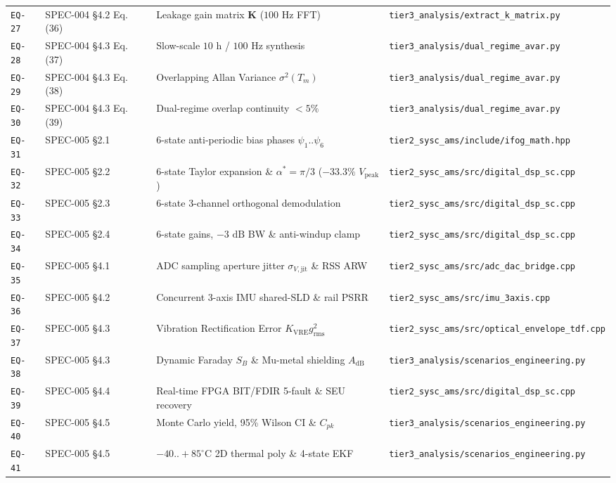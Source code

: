 \documentclass[11pt,a4paper]{article}
\begin{document}
\begin{longtable}{@{}l l l l@{}}
\texttt{EQ-27} & SPEC-004 \S 4.2 Eq. (36) & Leakage gain matrix $\mathbf{K}$ ($100\text{ Hz}$ FFT) & \texttt{tier3\_analysis/extract\_k\_matrix.py} \\
\texttt{EQ-28} & SPEC-004 \S 4.3 Eq. (37) & Slow-scale $10\text{ h}$ / $100\text{ Hz}$ synthesis & \texttt{tier3\_analysis/dual\_regime\_avar.py} \\
\texttt{EQ-29} & SPEC-004 \S 4.3 Eq. (38) & Overlapping Allan Variance $\sigma^2(T_m)$ & \texttt{tier3\_analysis/dual\_regime\_avar.py} \\
\texttt{EQ-30} & SPEC-004 \S 4.3 Eq. (39) & Dual-regime overlap continuity $< 5\%$ & \texttt{tier3\_analysis/dual\_regime\_avar.py} \\
\texttt{EQ-31} & SPEC-005 \S 2.1 & 6-state anti-periodic bias phases $\psi_1..\psi_6$ & \texttt{tier2\_sysc\_ams/include/ifog\_math.hpp} \\
\texttt{EQ-32} & SPEC-005 \S 2.2 & 6-state Taylor expansion \& $\alpha^*=\pi/3$ ($-33.3\%$ $V_{\text{peak}}$) & \texttt{tier2\_sysc\_ams/src/digital\_dsp\_sc.cpp} \\
\texttt{EQ-33} & SPEC-005 \S 2.3 & 6-state 3-channel orthogonal demodulation & \texttt{tier2\_sysc\_ams/src/digital\_dsp\_sc.cpp} \\
\texttt{EQ-34} & SPEC-005 \S 2.4 & 6-state gains, $-3\text{ dB}$ BW \& anti-windup clamp & \texttt{tier2\_sysc\_ams/src/digital\_dsp\_sc.cpp} \\
\texttt{EQ-35} & SPEC-005 \S 4.1 & ADC sampling aperture jitter $\sigma_{V,\text{jit}}$ \& RSS ARW & \texttt{tier2\_sysc\_ams/src/adc\_dac\_bridge.cpp} \\
\texttt{EQ-36} & SPEC-005 \S 4.2 & Concurrent 3-axis IMU shared-SLD \& rail PSRR & \texttt{tier2\_sysc\_ams/src/imu\_3axis.cpp} \\
\texttt{EQ-37} & SPEC-005 \S 4.3 & Vibration Rectification Error $K_{\text{VRE}}g_{\text{rms}}^2$ & \texttt{tier2\_sysc\_ams/src/optical\_envelope\_tdf.cpp} \\
\texttt{EQ-38} & SPEC-005 \S 4.3 & Dynamic Faraday $S_B$ \& Mu-metal shielding $A_{\text{dB}}$ & \texttt{tier3\_analysis/scenarios\_engineering.py} \\
\texttt{EQ-39} & SPEC-005 \S 4.4 & Real-time FPGA BIT/FDIR 5-fault \& SEU recovery & \texttt{tier2\_sysc\_ams/src/digital\_dsp\_sc.cpp} \\
\texttt{EQ-40} & SPEC-005 \S 4.5 & Monte Carlo yield, 95\% Wilson CI \& $C_{pk}$ & \texttt{tier3\_analysis/scenarios\_engineering.py} \\
\texttt{EQ-41} & SPEC-005 \S 4.5 & $-40..+85^\circ\text{C}$ 2D thermal poly \& 4-state EKF & \texttt{tier3\_analysis/scenarios\_engineering.py} \\

\end{longtable}
\end{document}
